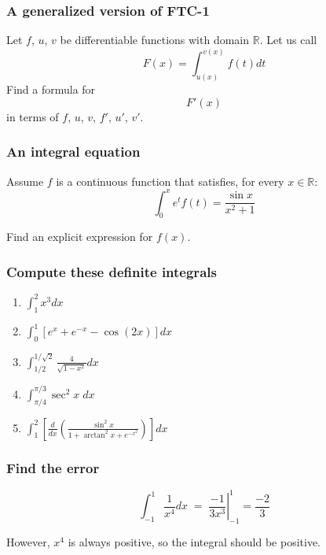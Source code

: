 \documentclass[14pt]{beamer}
\begin{document}
\begin{frame}[t]
	\frametitle{A generalized version of FTC-1}

	Let $f$, $u$, $v$ be differentiable functions with domain $\mathbb{R}$. Let us
	call
	\[
		F(x) = \int_{u(x)}^{v(x)}f(t) dt
	\]
	Find a formula for
	\[
		F'(x)
	\]
	in terms of $f$, $u$, $v$, $f'$, $u'$, $v'$.
\end{frame}

\begin{frame}[t]
	\frametitle{An integral equation}

	Assume $f$ is a continuous function that satisfies, for every $x \in \mathbb{R}$:
	\[
		\int_{0}^{x}e^{t}f(t) = \frac{\sin x}{x^{2}+1}
	\]

	Find an explicit expression for $f(x)$.
\end{frame}

\begin{frame}[t]
	\frametitle{Compute these definite integrals}

	\begin{enumerate}
		\item $\displaystyle \int_{1}^{2}x^{3}dx$
			\vfill

		\item $\displaystyle \int_{0}^{1}\left[ e^{x}+ e^{-x}- \cos (2x) \right] dx$
			\vfill

		\item $\displaystyle \int_{1/2}^{1/\sqrt{2}}\frac{4}{\sqrt{1-x^{2}}}dx$
			\vfill

		\item $\displaystyle \int_{\pi/4}^{\pi/3}\sec^{2}x \; dx$
			\vfill

		\item $\displaystyle \int_{1}^{2}\left[ \frac{d}{dx}\left( \frac{\sin^{2}x }{1
			+ \arctan^{2}x + e^{-x^2}}\right) \right] dx$
			\vfill
	\end{enumerate}
\end{frame}

\begin{frame}[t]
	\frametitle{Find the error}

	\[
		\int_{-1}^{1}\frac{1}{x^{4}}dx \; = \; \left. \frac{-1}{3x^{3}}\right\vert_{-1}
		^{1}= \frac{-2}{3}
	\]

	However, $x^{4}$ is always positive, so the integral should be positive.
\end{frame}
\end{document}

